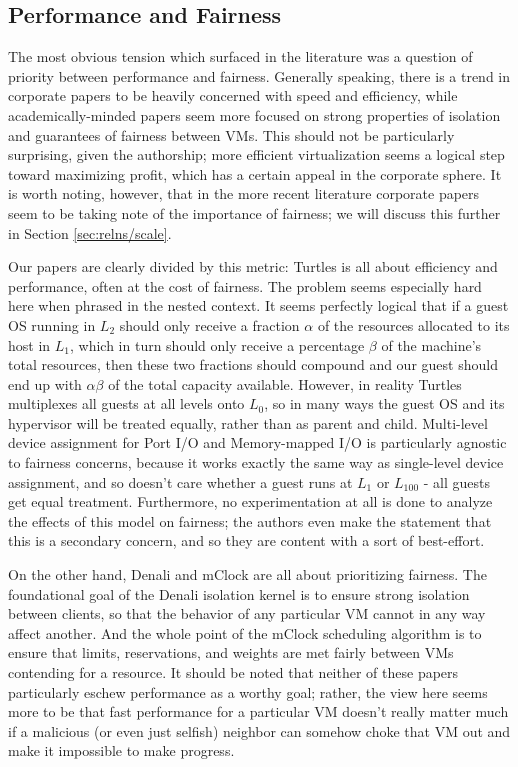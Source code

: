 \documentclass[letterpaper, twocolumn]{article}
\begin{document}
\subsection{Performance and Fairness}
\label{sec:relns/perf-fair}

The most obvious tension which surfaced in the literature was a question
of priority between performance and fairness.  Generally speaking, there is a trend
in corporate papers to be heavily concerned with speed and efficiency, while
academically-minded papers seem more focused on strong properties of isolation
and guarantees of fairness between VMs.  This should not be particularly surprising,
given the authorship; more efficient virtualization seems a logical step toward maximizing
profit, which has a certain appeal in the corporate sphere.  It is worth noting, however,
that in the more recent literature corporate papers seem to be taking note of the
importance of fairness; we will discuss this further in Section \ref{sec:relns/scale}.

Our papers are clearly divided by this metric:  Turtles is all about efficiency
and performance, often at the cost of fairness.  The problem seems
especially hard here when phrased in the nested context.  It seems perfectly logical that if
a guest OS running in $L_2$ should only receive a fraction $\alpha$ of the resources allocated
to its host in $L_1$, which in turn should only receive a percentage $\beta$ of the machine's
total resources, then these two fractions should compound and our guest should end up with
$\alpha\beta$ of the total capacity available.  However, in reality Turtles multiplexes
all guests at all levels onto $L_0$, so in many ways the guest OS and its hypervisor will
be treated equally, rather than as parent and child.  Multi-level device assignment
for Port I/O and Memory-mapped I/O is particularly agnostic to fairness concerns, because
it works exactly the same way as single-level device assignment, and so doesn't care whether
a guest runs at $L_1$ or $L_{100}$ - all guests get equal treatment.  Furthermore, no
experimentation at all is done to analyze the effects of this model on fairness;
the authors even make the statement that this is a secondary concern,
and so they are content with a sort of best-effort.

On the other hand, Denali and mClock are all about prioritizing fairness.  The foundational
goal of the Denali isolation kernel is to ensure strong isolation between clients, so that
the behavior of any particular VM cannot in any way affect another.  And the whole point of
the mClock scheduling algorithm is to ensure that limits, reservations, and weights
are met fairly between VMs contending for a resource.  It should be noted that neither
of these papers particularly eschew performance as a worthy goal; rather, the view
here seems more to be that fast performance for a particular VM doesn't really
matter much if a malicious (or even just selfish) neighbor can somehow choke that VM
out and make it impossible to make progress.
\end{document}
